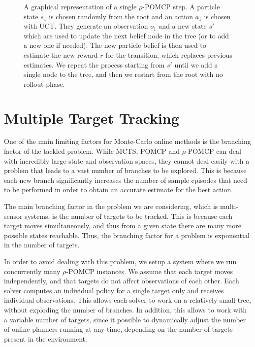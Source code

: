 \begin{figure}[ht!]
\caption{A graphical representation of a single $\rho$-POMCP step. A particle state $s_1$ is chosen randomly from the root and an action $a_1$ is chosen with UCT. They generate an observation $o_1$ and a new state $s'$ which are used to update the next belief node in the tree (or to add a new one if needed). The new particle belief is then used to estimate the new reward $r$ for the transition, which replaces previous estimates. We repeat the process starting from $s'$ until we add a single node to the tree, and then we restart from the root with no rollout phase.}
\label{ref:rpomcpimg}
\end{figure}

\section{Multiple Target Tracking}

One of the main limiting factors for Monte-Carlo online methods is the branching factor of the
tackled problem. While MCTS, POMCP and $\rho$-POMCP can deal with incredibly large state and
observation spaces, they cannot deal easily with a problem that leads to a vast number of branches
to be explored. This is because each new branch significantly increases the number of sample
episodes that need to be performed in order to obtain an accurate estimate for the best action.

The main branching factor in the problem we are considering, which is multi-sensor systems, is the
number of targets to be tracked. This is because each target moves simultaneously, and thus from a
given state there are many more possible states reachable. Thus, the branching factor for a problem
is exponential in the number of targets.

In order to avoid dealing with this problem, we setup a system where we run concurrently many
$\rho$-POMCP instances. We assume that each target moves independently, and that targets do not
affect observations of each other. Each solver computes an individual policy for a single target
only and receives individual observations. This allows each solver to work on a relatively small
tree, without exploding the number of branches. In addition, this allows to work with a variable
number of targets, since it possible to dynamically adjust the number of online planners running at
any time, depending on the number of targets present in the environment.

